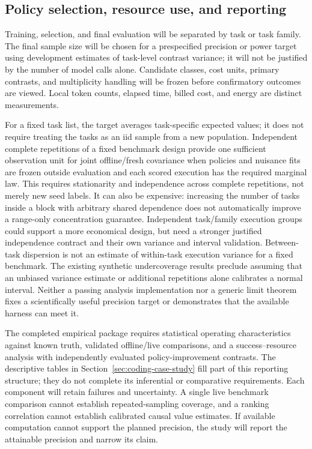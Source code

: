 \subsection{Policy selection, resource use, and reporting}
Training, selection, and final evaluation will be separated by task or task family. The final sample size will be chosen for a prespecified precision or power target using development estimates of task-level contrast variance; it will not be justified by the number of model calls alone. Candidate classes, cost units, primary contrasts, and multiplicity handling will be frozen before confirmatory outcomes are viewed. Local token counts, elapsed time, billed cost, and energy are distinct measurements.

For a fixed task list, the target averages task-specific expected values; it does not require treating the
tasks as an iid sample from a new population. Independent complete repetitions of a fixed benchmark design
provide one sufficient observation unit for joint offline/fresh covariance when policies and nuisance fits
are frozen outside evaluation and each scored execution has the required marginal law. This requires
stationarity and independence across complete repetitions, not merely new seed labels. It can also be
expensive: increasing the number of tasks inside a block with arbitrary shared dependence does not
automatically improve a range-only concentration guarantee. Independent task/family execution groups
could support a more economical design, but need a stronger justified independence contract and their
own variance and interval validation. Between-task dispersion is not an estimate of within-task execution
variance for a fixed benchmark. The existing synthetic undercoverage results preclude assuming that an
unbiased variance estimate or additional repetitions alone calibrates a normal interval. Neither a passing
analysis implementation nor a generic limit theorem fixes a scientifically useful precision target or
demonstrates that the available harness can meet it.

The completed empirical package requires statistical operating characteristics against known truth, validated
offline/live comparisons, and a success--resource analysis with independently evaluated policy-improvement
contrasts. The descriptive tables in Section~\ref{sec:coding-case-study} fill part of this reporting structure;
they do not complete its inferential or comparative requirements. Each component will retain failures and
uncertainty. A single live benchmark comparison cannot establish repeated-sampling coverage, and a ranking
correlation cannot establish calibrated causal value estimates. If available computation cannot support the
planned precision, the study will report the attainable precision and narrow its claim.
